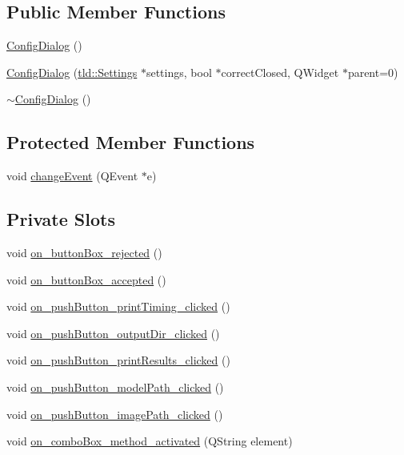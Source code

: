 \subsection*{Public Member Functions}
\begin{DoxyCompactItemize}
\item 
\hyperlink{classConfigDialog_a28fcaf732c9f363b30b2fc4a9abd9251}{Config\-Dialog} ()
\item 
\hyperlink{classConfigDialog_a45966fcb35bfca9ee45fe9fc9447a4f5}{Config\-Dialog} (\hyperlink{classtld_1_1Settings}{tld\-::\-Settings} $\ast$settings, bool $\ast$correct\-Closed, Q\-Widget $\ast$parent=0)
\item 
\hyperlink{classConfigDialog_a485badac4dffa04603f800bb9d396e1d}{$\sim$\-Config\-Dialog} ()
\end{DoxyCompactItemize}
\subsection*{Protected Member Functions}
\begin{DoxyCompactItemize}
\item 
void \hyperlink{classConfigDialog_a1d92274ba705553f051b1458aaf3d17a}{change\-Event} (Q\-Event $\ast$e)
\end{DoxyCompactItemize}
\subsection*{Private Slots}
\begin{DoxyCompactItemize}
\item 
void \hyperlink{classConfigDialog_af7cc8e52db580a91f560e5d60fa53be1}{on\-\_\-button\-Box\-\_\-rejected} ()
\item 
void \hyperlink{classConfigDialog_a99ff17058888a9f4680d931b3dbcc107}{on\-\_\-button\-Box\-\_\-accepted} ()
\item 
void \hyperlink{classConfigDialog_a213196688dcf491b2118cef2ac0c4d5d}{on\-\_\-push\-Button\-\_\-print\-Timing\-\_\-clicked} ()
\item 
void \hyperlink{classConfigDialog_afcb1c471f181177573ee6e9ebd2e33e7}{on\-\_\-push\-Button\-\_\-output\-Dir\-\_\-clicked} ()
\item 
void \hyperlink{classConfigDialog_a2ac4e126ef0f47b9ccf800bbb2560885}{on\-\_\-push\-Button\-\_\-print\-Results\-\_\-clicked} ()
\item 
void \hyperlink{classConfigDialog_a80ba58182a35015b4cc5c542b0c62fcb}{on\-\_\-push\-Button\-\_\-model\-Path\-\_\-clicked} ()
\item 
void \hyperlink{classConfigDialog_a05e105aa3357b7fb82a2f5815b2cb853}{on\-\_\-push\-Button\-\_\-image\-Path\-\_\-clicked} ()
\item 
void \hyperlink{classConfigDialog_a8f035c7e6b76c9a00b2dbc4a9bbffa2a}{on\-\_\-combo\-Box\-\_\-method\-\_\-activated} (Q\-String element)
\end{DoxyCompactItemize}
